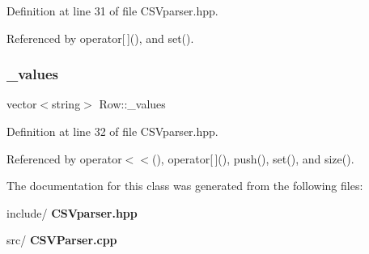 Definition at line 31 of file C\+S\+Vparser.\+hpp.



Referenced by operator[$\,$](), and set().

\mbox{\label{class_row_ab064db33f941055c8d99a6f47eae733c}} 
\subsubsection{\_values}
{\footnotesize\ttfamily vector$<$string$>$ Row\+::\+\_\+values\hspace{0.3cm}{\ttfamily [private]}}



Definition at line 32 of file C\+S\+Vparser.\+hpp.



Referenced by operator$<$$<$(), operator[$\,$](), push(), set(), and size().



The documentation for this class was generated from the following files\+:\begin{DoxyCompactItemize}
\item 
include/\textbf{ C\+S\+Vparser.\+hpp}\item 
src/\textbf{ C\+S\+V\+Parser.\+cpp}\end{DoxyCompactItemize}

